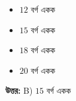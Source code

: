 \documentclass[12pt, a4paper]{article}
\begin{document}
\begin{itemize}[label={}, leftmargin=1cm, itemsep=0.5em]
    \item[\textbf{A)}] $12$ বর্গ একক
    \item[\textbf{B)}] $15$ বর্গ একক
    \item[\textbf{C)}] $18$ বর্গ একক
    \item[\textbf{D)}] $20$ বর্গ একক
\end{itemize}

\vspace{0.5em}
\begin{tcolorbox}[answerbox]
    \textbf{\color{success} উত্তর:} B) $15$ বর্গ একক
\end{tcolorbox}
\vspace{1em}
\end{document}
